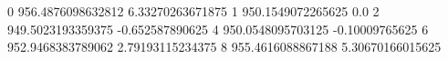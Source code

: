 0 956.4876098632812 6.33270263671875
1 950.1549072265625 0.0
2 949.5023193359375 -0.652587890625
4 950.0548095703125 -0.10009765625
6 952.9468383789062 2.79193115234375
8 955.4616088867188 5.30670166015625
